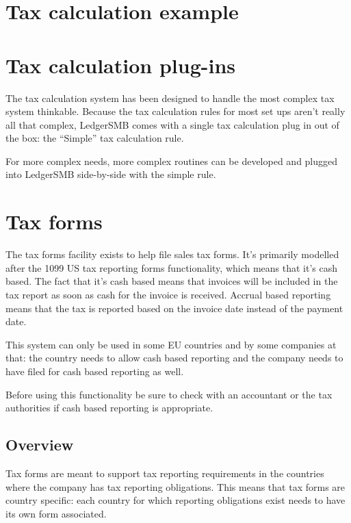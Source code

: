 \section{Tax calculation example}


\section{Tax calculation plug-ins}
\label{sec:TaxRulePlugins}

The tax calculation system has been designed to handle the most complex tax system
thinkable. Because the tax calculation rules for most set ups aren't really all that
complex, LedgerSMB comes with a single tax calculation plug in out of the box: the
``Simple'' tax calculation rule.

For more complex needs, more complex routines can be developed and plugged into
LedgerSMB side-by-side with the simple rule.


\section{Tax forms}

The tax forms facility exists to help file sales tax forms. It's primarily modelled
after the 1099 US tax reporting forms functionality, which means that it's cash based.
The fact that it's cash based means that invoices will be included in the tax report
as soon as cash for the invoice is received. Accrual based reporting means that the
tax is reported based on the invoice date instead of the payment date.

This system can only be used in some EU countries and by some companies at that: the
country needs to allow cash based reporting and the company needs to have filed
for cash based reporting as well.

Before using this functionality be sure to check with an accountant or the tax
authorities if cash based reporting is appropriate.

\subsection{Overview}
Tax forms are meant to support tax reporting requirements in the countries
where the company has tax reporting obligations. This means that tax forms
are country specific: each country for which reporting obligations exist
needs to have its own form associated.

